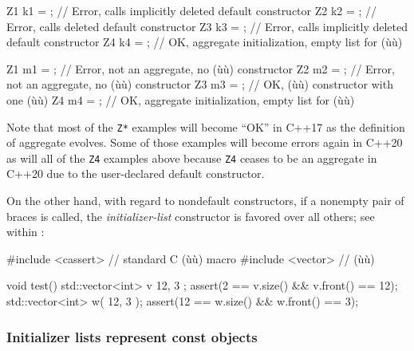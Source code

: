 \begin{emcppslisting}
{    Z1 k1 = {};    // Error, calls implicitly deleted default constructor
    Z2 k2 = {};    // Error, calls deleted default constructor
    Z3 k3 = {};    // Error, calls implicitly deleted default constructor
    Z4 k4 = {};    // OK, aggregate initialization, empty list for (ù{}ù)

    Z1 m1 = {{}};  // Error, not an aggregate, no (ù{}ù) constructor
    Z2 m2 = {{}};  // Error, not an aggregate, no (ù{}ù) constructor
    Z3 m3 = {{}};  // OK, (ù{}ù) constructor with one (ù{}ù)
    Z4 m4 = {{}};  // OK, aggregate initialization, empty list for (ù{}ù)
}
\end{emcppslisting}
    

\noindent Note that most of the \lstinline!Z*! examples will become ``OK'' in C++17
as the definition of aggregate evolves. Some of those examples will
become errors again in C++20 as will all of the \lstinline!Z4! examples
above because \lstinline!Z4! ceases to be an aggregate in C++20 due to the
user-declared default constructor.

On the other hand, with regard to nondefault constructors, if a nonempty
pair of braces is called, the \emph{initializer-list} constructor is
favored over all others; see  within :

\begin{emcppshiddenlisting}[emcppsbatch=e9]
#include <cassert>   // standard C (ù{}ù) macro
#include <vector>  // (ù{}ù)
\end{emcppshiddenlisting}
\begin{emcppslisting}[emcppsbatch=e9]
void test()
{
    std::vector<int> v{ 12, 3 };
    assert(2 == v.size() && v.front() == 12);
    std::vector<int> w( 12, 3 );
    assert(12 == w.size() && w.front() == 3);
}
\end{emcppslisting}
    

\subsubsection[Initializer lists represent \lstinline!const! objects]{Initializer lists represent {\SubsubsecCode const} objects}\label{initializer-lists-represent-const-objects}

